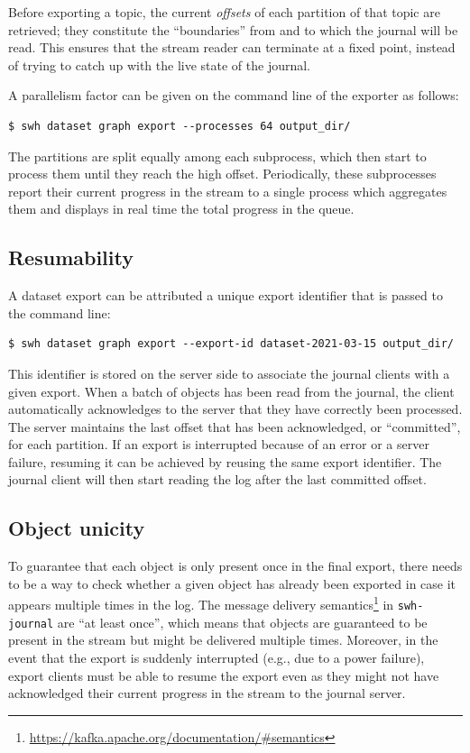 Before exporting a topic, the current \emph{offsets} of each partition of that
topic are retrieved; they constitute the ``boundaries'' from and to which the
journal will be read. This ensures that the stream reader can terminate at a
fixed point, instead of trying to catch up with the live state of the journal.

A parallelism factor can be given on the command line of the exporter as
follows:

\begin{verbatim}
$ swh dataset graph export --processes 64 output_dir/
\end{verbatim}

The partitions are split equally among each subprocess, which then start to
process them until they reach the high offset. Periodically, these subprocesses
report their current progress in the stream to a single process which
aggregates them and displays in real time the total progress in the queue.

\subsection{Resumability}

A dataset export can be attributed a unique export identifier that is passed
to the command line:

\begin{verbatim}
$ swh dataset graph export --export-id dataset-2021-03-15 output_dir/
\end{verbatim}

This identifier is stored on the server side to associate the journal clients
with a given export.
When a batch of objects has been read from the journal, the client
automatically acknowledges to the server that they have correctly been
processed. The server maintains the last offset that has been acknowledged, or
``committed'', for each partition.
If an export is interrupted because of an error or a server failure, resuming
it can be achieved by reusing the same export identifier. The journal client
will then start reading the log after the last committed offset.

\subsection{Object unicity}
\label{sec:dataset-export-unicity}

To guarantee that each object is only present once in the final export, there
needs to be a way to check whether a given object has already been exported in
case it appears multiple times in the log. The message delivery
semantics\footnote{\url{https://kafka.apache.org/documentation/\#semantics}} in
\texttt{swh-journal} are ``at least once'', which means that objects are
guaranteed to be present in the stream but might be delivered multiple times.
Moreover, in the event that the export is suddenly interrupted (e.g., due to a
power failure), export clients must be able to resume the export even as they
might not have acknowledged their current progress in the stream to the journal
server.

